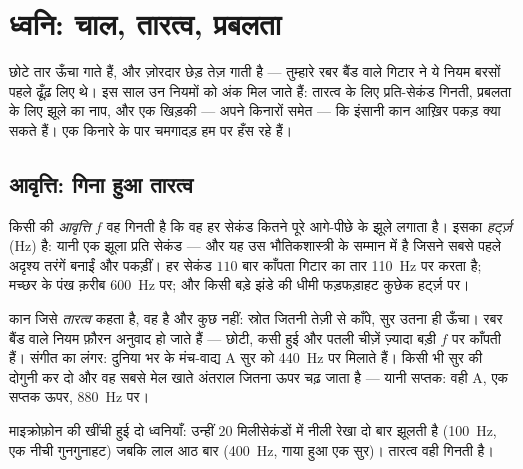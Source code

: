 \chapter{ध्वनि: चाल, तारत्व, प्रबलता}\label{ch:g8:sound-pitch-loudness}

छोटे तार ऊँचा गाते हैं, और ज़ोरदार छेड़ तेज़ गाती है --- तुम्हारे रबर
बैंड वाले गिटार ने ये नियम बरसों पहले ढूँढ़ लिए थे। इस साल उन नियमों
को अंक मिल जाते हैं: तारत्व के लिए प्रति-सेकंड गिनती, प्रबलता के लिए
झूले का नाप, और एक खिड़की --- अपने किनारों समेत --- कि इंसानी कान
आख़िर पकड़ क्या सकते हैं। एक किनारे के पार चमगादड़ हम पर हँस रहे हैं।

\section{आवृत्ति: गिना हुआ तारत्व}

\begin{definition}[आवृत्ति]\label{def:g8:sound-pitch-loudness:frequency}
किसी  की \emph{आवृत्ति} $f$ वह गिनती है कि वह हर
सेकंड कितने पूरे आगे-पीछे के झूले लगाता है। इसका 
\emph{हर्ट्ज़} (\unit{Hz}) है: यानी एक झूला प्रति सेकंड
--- और यह उस भौतिकशास्त्री के सम्मान में है जिसने सबसे पहले अदृश्य
तरंगें बनाईं और पकड़ीं। हर सेकंड $110$ बार काँपता गिटार का तार
\qty{110}{Hz} पर  करता है; मच्छर के पंख क़रीब \qty{600}{Hz} पर;
और किसी बड़े झंडे की धीमी फड़फड़ाहट कुछेक हर्ट्ज़ पर।
\end{definition}

\begin{proposition}[तारत्व ही आवृत्ति है]\label{prop:g8:sound-pitch-loudness:pitch}
कान जिसे \emph{तारत्व} कहता है, वह  है और कुछ नहीं: स्रोत
जितनी तेज़ी से काँपे, सुर उतना ही ऊँचा। रबर बैंड वाले नियम फ़ौरन
अनुवाद हो जाते हैं --- छोटी, कसी हुई और पतली चीज़ें ज़्यादा बड़ी $f$
पर काँपती हैं। संगीत का लंगर: दुनिया भर के मंच-वाद्य A सुर को
\qty{440}{Hz} पर मिलाते हैं। किसी भी सुर की  दोगुनी कर दो और वह
सबसे मेल खाते अंतराल जितना ऊपर चढ़ जाता है --- यानी सप्तक: वही A,
एक सप्तक ऊपर, \qty{880}{Hz} पर।
\end{proposition}

\begin{omfigure}

{\small माइक्रोफ़ोन की खींची हुई दो ध्वनियाँ: उन्हीं $20$ मिलीसेकंडों
में नीली रेखा दो बार झूलती है (\qty{100}{Hz}, एक नीची गुनगुनाहट) जबकि
लाल आठ बार (\qty{400}{Hz}, गाया हुआ एक सुर)। तारत्व वही गिनती है।}
\end{omfigure}

